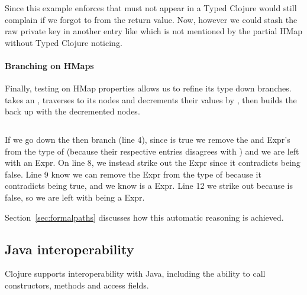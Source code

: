 \begin{exmp}
\inputminted[firstline=10,lastline=21]{clojure}{code/demo/src/demo/key2.clj}
\label{example:absentkeys}
\end{exmp}

Since this example enforces that  must not appear
in a 
Typed Clojure would still complain if we forgot to  
from the return value.
Now, however we could stash the raw private key in another entry
like  which is not mentioned by the partial HMap 
without Typed Clojure noticing.

\paragraph{Branching on HMaps} Finally, testing on HMap properties
allows us to refine its type down branches.  takes an
, traverses to its nodes and decrements their values by , then
builds the  back up with the decremented nodes.

\begin{exmp}
\inputminted[linenos,firstnumber=1,firstline=15,lastline=27]{clojure}{code/demo/src/demo/hmap.clj}
\label{example:decmap}
\end{exmp}

If we go down the then branch (line 4), since  is true
we remove
the  and 
Expr's from the type of  (because their respective  entries disagrees with )
and we are left with an  Expr.
On line 8,
we instead strike out the  Expr since it contradicts  being false. 
Line 9 know we can
remove the  Expr from the type of  because it contradicts  being true,
and we know  is a  Expr.
Line 12 we strike out  because  is false,
so we are left with  being a  Expr.

Section~\ref{sec:formalpaths} discusses how this automatic reasoning is achieved.

\subsection{Java interoperability}
\label{sec:overviewjavainterop}

Clojure supports interoperability with Java, including the ability to
call constructors, methods and access fields.

